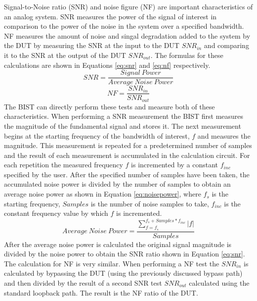 \documentclass[12pt]{report}
\begin{document}
Signal-to-Noise ratio (SNR) and noise figure (NF) are important characteristics of an analog system.  SNR measures the power of the signal of interest in comparison to the power of the noise in the system over a specified bandwidth.  NF measures the amount of noise and singal degradation added to the system by the DUT by measuring the SNR at the input to the DUT $SNR_{in}$ and comparing it to the SNR at the output of the DUT $SNR_{out}$.  The formulas for these calculations are shown in Equations \ref{eq:snr} and \ref{eq:nf} respectively\cite{stroud-nf}.
\begin{equation}
SNR = \frac{Signal\ Power}{Average\ Noise\ Power}
\label{eq:snr}
\end{equation}
\begin{equation}
NF = \frac{SNR_{in}}{SNR_{out}}
\label{eq:nf}
\end{equation}
The BIST can directly perform these tests and measure both of these characteristics.  When performing a SNR measurement the BIST first measures the magnitude of the fundamental signal and stores it.  The next measurement begins at the starting frequency of the bandwidth of interest, $f$ and measures the magnitude.  This measurement is repeated for a predetermined number of samples and the result of each measurement is accumulated in the calculation circuit.  For each repetition the measured frequency $f$ is incremented by a constant $f_{inc}$ specified by the user.  After the specified number of samples have been taken, the accumulated noise power is divided by the number of samples to obtain an average noise power as shown in Equation \ref{eq:noisepower}, where $f_s$ is the starting frequency, $Samples$ is the number of noise samples to take, $f_{inc}$ is the constant frequency value by which $f$ is incremented.
\begin{equation}
Average\ Noise\ Power =  \frac{\sum_{f=f_s}^{f_s+Samples*f_{inc}} |f|}{Samples}
\label{eq:noisepower}
\end{equation}
After the average noise power is calculated the original signal magnitude is divided by the noise power to obtain the SNR ratio shown in Equation \ref{eq:snr}.  The calculation for NF is very similar.  When performing a NF test the $SNR_{in}$ is calculated by bypassing the DUT (using the previously discussed bypass path) and then divided by the result of a second SNR test $SNR_{out}$ calculated using the standard loopback path.  The result is the NF ratio of the DUT\cite{stroud-nf}.
\end{document}

